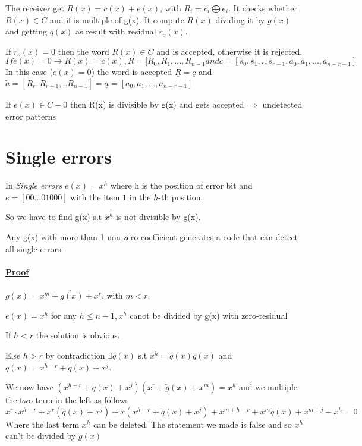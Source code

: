 The receiver get $R(x) = c(x) + e(x)$, with $R_i = c_i \bigoplus e_i$. It checks whether $R(x) \in C$ and if is multiple of g(x). It compute $R(x)$ dividing it by $g(x)$ and getting $q(x)$ as result with residual $r_o(x)$. 

If $r_o(x) = 0$ then the word $R(x) \in C$ and is accepted, otherwise it is rejected. 
\begin{equation}
If e(x) = 0 \rightarrow R(x) = c(x), \underline{R} = [R_0,R_1,...,R_{n-1} and \underline{c} = [s_0,s_1,...s_{r-1},a_0,a_1,...,a_{n-r-1}]
\end{equation}
In this case ($e(x) = 0$) the word is accepted $\underline{R} = \underline{c}$ and $\widetilde{a} = [R_r,R_{r+1},..R_{n-1}] = \underline{a} = [a_0,a_1,...,a_{n-r-1}]$

If $e(x) \in C - {0}$ then R(x) is divisible by g(x) and gets accepted $\Rightarrow$ undetected error patterns

\section{Single errors}
In \emph{Single errors} $e(x) = x^h$ where h is the position of error bit and $\underline{e} = [00...01000]$ with the item $1$ in the $h$-th position. 

So we have to find g(x) s.t $x^h$ is not divisible by g(x). 
\begin{theorem}
Any g(x) with more than 1 non-zero coefficient generates a code that can detect all single errors. 
\end{theorem}

\paragraph{\underline{\textbf{Proof}}}
$g(x) = x^m + \widetilde{g(x)} + x^r$, with $m < r$. 

$e(x) = x^h$ for any $h \leq n - 1, x^h$ canot be divided by g(x) with zero-residual

If $h < r$ the solution is obvious.

Else $h > r$ by contradiction $\exists q(x)$ s.t $x^h = q(x)g(x)$ and $q(x) = x^{h-r} + \widetilde{q}(x) + x^j$. 

We now have $(x^{h-r} + \widetilde{q}(x) + x^j)(x^r + \widetilde{g}(x) + x^m) = x^h$ and we multiple the two term in the left as follows
\begin{equation}
x^r\cdot x^{h-r} + x^r(\widetilde{q}(x)+x^j) + \widetilde{x}(x^{h-r}+\widetilde{q}(x)+x^j) + x^{m+h-r} + x^m\widetilde{q}(x) + x^{m+j} - x^h = 0
\end{equation}
Where the last term $x^h$ can be deleted. 
The statement we made is false and so $x^h$ can't be divided by $g(x)$

